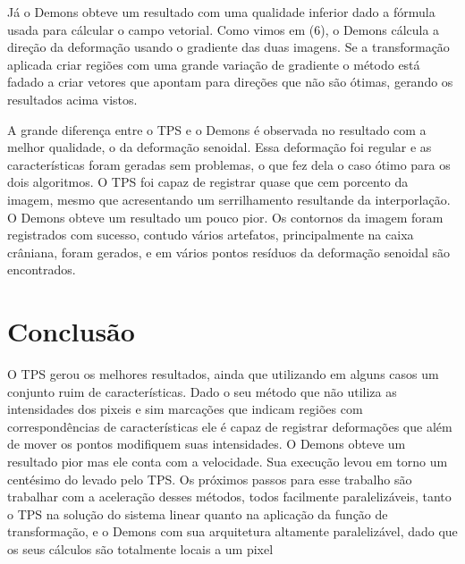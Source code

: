 \documentclass[]{spie}  %
\begin{document}
	Já o Demons obteve um resultado com uma qualidade inferior dado a fórmula usada para cálcular o campo vetorial.
Como vimos em (6), o Demons cálcula a direção da deformação usando o gradiente das duas imagens. Se a transformação
aplicada criar regiões com uma grande variação de gradiente o método está fadado a criar vetores que apontam para direções
que não são ótimas, gerando os resultados acima vistos.

	A grande diferença entre o TPS e o Demons é observada no resultado com a melhor qualidade, o da deformação
senoidal. Essa deformação foi regular e as características foram geradas sem problemas, o que fez dela o caso ótimo
para os dois algoritmos. O TPS foi capaz de registrar quase que cem porcento da imagem, mesmo que acresentando um
serrilhamento resultande da interporlação. O Demons obteve um resultado um pouco pior. Os contornos da imagem foram
registrados com sucesso, contudo vários artefatos, principalmente na caixa crâniana, foram gerados, e em vários pontos
resíduos da deformação senoidal são encontrados.

\section{Conclusão}
	O TPS gerou os melhores resultados, ainda que utilizando em alguns casos um conjunto ruim de características. Dado 
o seu método que não utiliza as intensidades dos pixeis e sim marcações que indicam regiões com correspondências de 
características ele é capaz de registrar deformações que além de mover os pontos modifiquem suas intensidades. O Demons
obteve um resultado pior mas ele conta com a velocidade. Sua execução levou em torno um centésimo do levado pelo TPS. Os 
próximos passos para esse trabalho são trabalhar com a aceleração desses métodos, todos
facilmente paralelizáveis, tanto o TPS na solução do sistema linear quanto na aplicação da função de transformação, e o 
Demons com sua arquitetura altamente paralelizável, dado que os seus cálculos são totalmente locais a um pixel
\end{document}
